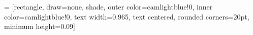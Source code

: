 %
%
%                 

\newcommand{\myfig}[3][0]{
\begin{center}
  \vspace{1.5cm}
  \texttt{[image: \#2]}
  \nobreak\medskip
\end{center}}

%
%
%

\setcounter{figure}{1}
\newcommand{\mycaption}[1]{
  \vspace{0.5cm}
  \begin{quote}
    {{\sc Figure} \arabic{figure}: #1}
  \end{quote}
  \vspace{1cm}
  \stepcounter{figure}
}

%
%


%
%

\setlength{\columnsep}{0.03\textwidth}
\setlength{\columnseprule}{0.0018\textwidth}
\setlength{\parindent}{0.0cm}

%
% 
%

 = [rectangle, 
			draw=none, 
			shade, 
			outer color=camlightblue!0,
			inner color=camlightblue!0,
			text width=0.965\columnwidth,
			text centered,
			rounded corners=20pt,
			minimum height=0.09\columnwidth]

